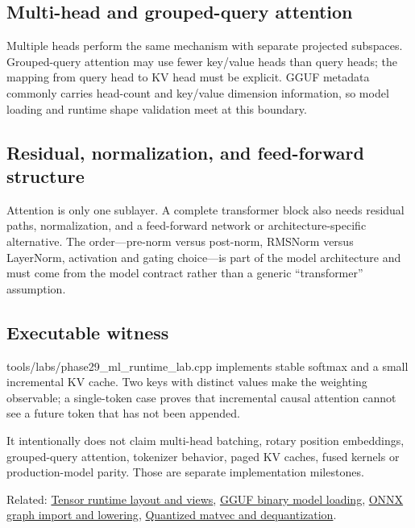 \subsection{Multi-head and grouped-query attention}\label{appendix-ea2dadd21ce5-multi-head-and-grouped-query-attention}

Multiple heads perform the same mechanism with separate projected subspaces. Grouped-query attention may use fewer key/value heads than query heads; the mapping from query head to KV head must be explicit. GGUF metadata commonly carries head-count and key/value dimension information, so model loading and runtime shape validation meet at this boundary.

\subsection{Residual, normalization, and feed-forward structure}\label{appendix-ea2dadd21ce5-residual-normalization-and-feed-forward-structure}

Attention is only one sublayer. A complete transformer block also needs residual paths, normalization, and a feed-forward network or architecture-specific alternative. The order---pre-norm versus post-norm, RMSNorm versus LayerNorm, activation and gating choice---is part of the model architecture and must come from the model contract rather than a generic ``transformer'' assumption.

\subsection{Executable witness}\label{appendix-ea2dadd21ce5-executable-witness}

tools/labs/phase29\_ml\_runtime\_lab.cpp implements stable softmax and a small incremental KV cache. Two keys with distinct values make the weighting observable; a single-token case proves that incremental causal attention cannot see a future token that has not been appended.

It intentionally does not claim multi-head batching, rotary position embeddings, grouped-query attention, tokenizer behavior, paged KV caches, fused kernels or production-model parity. Those are separate implementation milestones.

Related: \hyperref[appendix-cebadf3106d1]{Tensor runtime layout and views}, \hyperref[appendix-fef72dd246f2]{GGUF binary model loading}, \hyperref[appendix-a87217e3af2b]{ONNX graph import and lowering}, \hyperref[appendix-241c0e42ac2d]{Quantized matvec and dequantization}.
